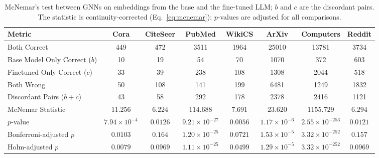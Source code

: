 \documentclass[a4paper,fleqn]{cas-sc}
\newcommand{\revthree}[1]{\textcolor{revgreen}{#1}} %
\begin{document}
\begin{table}[h]
\caption{McNemar's test between GNNs on embeddings from the base and the fine-tuned LLM; $b$ and $c$ are the discordant pairs. \revthree{The statistic is continuity-corrected (Eq.~\ref{eq:mcnemar}); $p$-values are adjusted for all comparisons.}}
\label{tab:mcnemar}
\small
\setlength{\tabcolsep}{3pt}
\begin{tabular*}{\textwidth}{@{\extracolsep{\fill}} lccccccc @{}}
\toprule
\textbf{Metric} & \textbf{Cora} & \textbf{CiteSeer} & \textbf{PubMed} & \textbf{WikiCS} & \revthree{\textbf{ArXiv}} & \revthree{\textbf{Computers}} & \revthree{\textbf{Reddit}} \\
\midrule
Both Correct & \revthree{449} & \revthree{472} & \revthree{3511} & \revthree{1964} & \revthree{25010} & \revthree{13781} & \revthree{3734} \\
Base Model Only Correct ($b$) & \revthree{10} & \revthree{19} & \revthree{54} & \revthree{70} & \revthree{1070} & \revthree{372} & \revthree{603} \\
Finetuned Only Correct ($c$) & \revthree{33} & \revthree{39} & \revthree{238} & \revthree{108} & \revthree{1308} & \revthree{2044} & \revthree{518} \\
Both Wrong & \revthree{50} & \revthree{108} & \revthree{141} & \revthree{199} & \revthree{6481} & \revthree{1249} & \revthree{1832} \\
Discordant Pairs ($b+c$) & \revthree{43} & \revthree{58} & \revthree{292} & \revthree{178} & \revthree{2378} & \revthree{2416} & \revthree{1121} \\
McNemar Statistic & \revthree{$11.256$} & \revthree{$6.224$} & \revthree{$114.688$} & \revthree{$7.691$} & \revthree{$23.620$} & \revthree{$1155.729$} & \revthree{$6.294$} \\
$p$-value & \revthree{$7.94\times10^{-4}$} & \revthree{$0.0126$} & \revthree{$9.21\times10^{-27}$} & \revthree{$0.0056$} & \revthree{$1.17\times10^{-6}$} & \revthree{$2.55\times10^{-253}$} & \revthree{$0.0121$} \\
\revthree{Bonferroni-adjusted $p$} & \revthree{$0.0103$} & \revthree{$0.164$} & \revthree{$1.20\times10^{-25}$} & \revthree{$0.0721$} & \revthree{$1.53\times10^{-5}$} & \revthree{$3.32\times10^{-252}$} & \revthree{$0.157$} \\
\revthree{Holm-adjusted $p$} & \revthree{$0.0079$} & \revthree{$0.0969$} & \revthree{$1.11\times10^{-25}$} & \revthree{$0.0499$} & \revthree{$1.29\times10^{-5}$} & \revthree{$3.32\times10^{-252}$} & \revthree{$0.0969$} \\

\end{tabular*}
\end{table}
\end{document}
